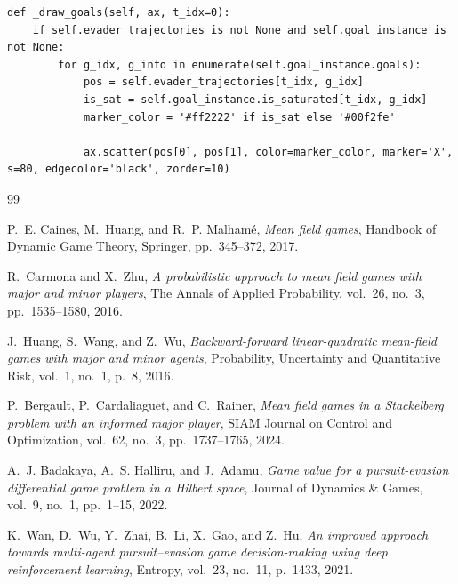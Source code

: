 \documentclass[11pt,a4paper]{article}
\begin{document}
\begin{verbatim}
def _draw_goals(self, ax, t_idx=0):
    if self.evader_trajectories is not None and self.goal_instance is not None:
        for g_idx, g_info in enumerate(self.goal_instance.goals):
            pos = self.evader_trajectories[t_idx, g_idx]
            is_sat = self.goal_instance.is_saturated[t_idx, g_idx]
            marker_color = '#ff2222' if is_sat else '#00f2fe'

            ax.scatter(pos[0], pos[1], color=marker_color, marker='X', s=80, edgecolor='black', zorder=10)
\end{verbatim}

\begin{thebibliography}{99}

P.~E. Caines, M.~Huang, and R.~P. Malham{\'e}, 
\emph{Mean field games}, 
Handbook of Dynamic Game Theory, Springer, pp.~345--372, 2017.

R.~Carmona and X.~Zhu, 
\emph{A probabilistic approach to mean field games with major and minor players}, 
The Annals of Applied Probability, vol.~26, no.~3, pp.~1535--1580, 2016.

J.~Huang, S.~Wang, and Z.~Wu, 
\emph{Backward-forward linear-quadratic mean-field games with major and minor agents}, 
Probability, Uncertainty and Quantitative Risk, vol.~1, no.~1, p.~8, 2016.

P.~Bergault, P.~Cardaliaguet, and C.~Rainer, 
\emph{Mean field games in a Stackelberg problem with an informed major player}, 
SIAM Journal on Control and Optimization, vol.~62, no.~3, pp.~1737--1765, 2024.

A.~J. Badakaya, A.~S. Halliru, and J.~Adamu, 
\emph{Game value for a pursuit-evasion differential game problem in a Hilbert space}, 
Journal of Dynamics \& Games, vol.~9, no.~1, pp.~1--15, 2022.

K.~Wan, D.~Wu, Y.~Zhai, B.~Li, X.~Gao, and Z.~Hu, 
\emph{An improved approach towards multi-agent pursuit--evasion game decision-making using deep reinforcement learning}, 
Entropy, vol.~23, no.~11, p.~1433, 2021.

\end{thebibliography}
\end{document}
